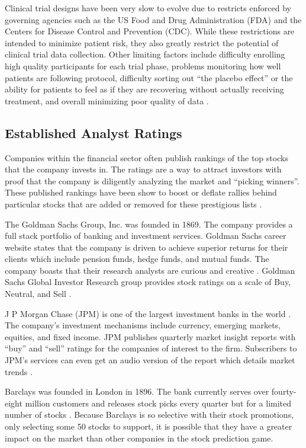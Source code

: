 \documentclass[sigconf]{acmart}
\begin{document}
Clinical trial designs have been very slow to evolve due to restricts enforced by governing agencies such as the US Food and Drug Administration (FDA) and the Centers for Disease Control and Prevention (CDC). While these restrictions are intended to minimize patient risk, they also greatly restrict the potential of clinical trial data collection. Other limiting factors include  difficulty enrolling high quality participants for each trial phase, problems monitoring how well patients are following protocol, difficulty sorting out ``the placebo effect'' or the ability for patients to feel as if they are recovering without actually receiving treatment, and overall minimizing poor quality of data \cite{Friedman}. 

\subsection{Established Analyst Ratings}
Companies within the financial sector often publish rankings of the top stocks that the company invests in. The ratings are a way to attract investors with proof that the company is diligently analyzing the market and ``picking winners''. These published rankings have been show to boost or deflate rallies behind particular stocks that are added or removed for these prestigious lists \cite{www-seekAnalyst}. 

The Goldman Sachs Group, Inc. was founded in 1869. The company provides a full stack portfolio of banking and investment services. Goldman Sachs career website states that the company is driven to achieve superior returns for their clients which include pension funds, hedge funds, and mutual funds. The company boasts that their research analysts are curious and creative \cite{www-gldmanGlance}. Goldman Sachs Global Investor Research group provides stock ratings on a scale of Buy, Neutral, and Sell \cite{www-goldmanTicker}. 

J P Morgan Chase (JPM) is one of the largest investment banks in the world \cite{www-investBanks}. The company's investment mechanisms include currency, emerging markets, equities, and fixed income. JPM publishes quarterly market insight reports with ``buy'' and ``sell'' ratings for the companies of interest to the firm. Subscribers to JPM's services can even get an audio version of the report which details market trends \cite{www-JPM}.

Barclays was founded in London in 1896. The bank currently serves over fourty-eight million customers and releases stock picks every quarter but for a limited number of stocks \cite{www-investBanks}. Because Barclays is so selective with their stock promotions, only selecting some 50 stocks to support, it is possible that they have a greater impact on the market than other companies in the stock prediction game. 
\end{document}
